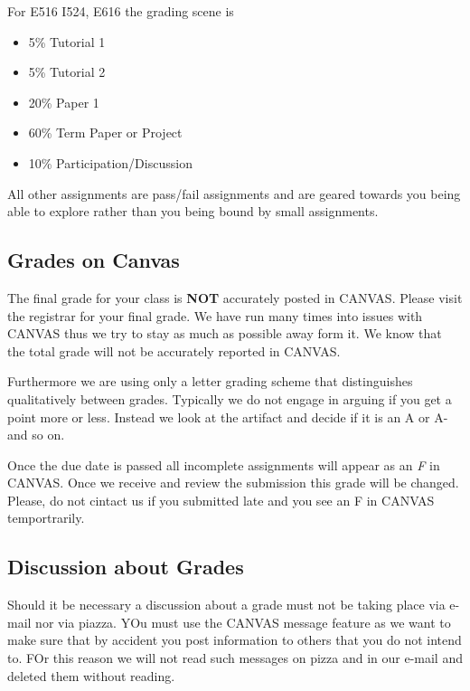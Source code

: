 For E516 I524, E616 the grading scene is

\begin{itemize}
\item 5\% Tutorial 1
\item 5\% Tutorial 2
\item 20\% Paper 1
\item 60\% Term Paper or Project
\item 10\% Participation/Discussion
\end{itemize}

All other assignments are pass/fail assignments and are geared towards
you being able to explore rather than you being bound by small
assignments.

\subsection{Grades on Canvas}

The final grade for your class is {\bf NOT} accurately posted in
CANVAS. Please visit the registrar for your final grade.
We have run many times into issues with CANVAS thus we try to stay as
much as possible away form it. We know that the total grade will not
be accurately reported in CANVAS.

Furthermore we are using only a letter grading scheme that
distinguishes qualitatively between grades. Typically we do not engage
in arguing if you get a point more or less. Instead we look at the
artifact and decide if it is an A or A- and so on.

Once the due date is passed all incomplete assignments will appear as
an {\em F} in CANVAS. Once we receive and review the submission this grade will
be changed. Please, do not cintact us if you submitted late and you
see an F in CANVAS temportrarily.

\subsection{Discussion about Grades}

Should it be necessary a discussion about a grade must not be taking
place via e-mail nor via piazza. YOu must use the CANVAS message
feature as we want to make sure that by accident you post information
to others that you do not intend to. FOr this reason we will not read
such messages on pizza and in our e-mail and deleted them without reading.
